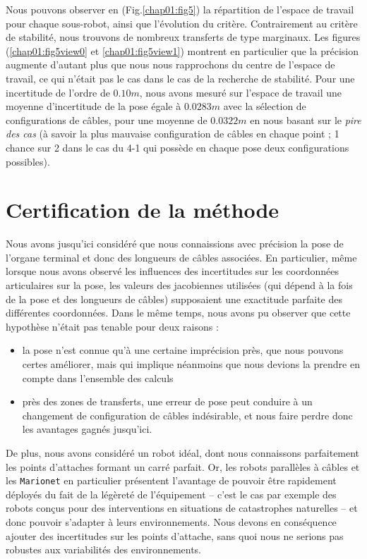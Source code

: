 Nous pouvons observer en (Fig.\ref{chap01:fig5}) la r\'epartition de l'espace 
de travail pour chaque sous-robot, ainsi que l'\'evolution du crit\`ere. 
Contrairement au crit\`ere de stabilit\'e, nous trouvons de nombreux transferts 
de type marginaux. Les figures (\ref{chap01:fig5view0} et 
\ref{chap01:fig5view1}) montrent en particulier que la pr\'ecision augmente 
d'autant plus que nous nous rapprochons du centre de l'espace de travail, ce qui 
n'\'etait pas le cas dans le cas de la recherche de stabilit\'e. Pour une 
incertitude de l'ordre de $0.10m$, nous avons mesur\'e sur l'espace de travail 
une moyenne d'incertitude de la pose \'egale \`a $0.0283m$ avec la s\'election 
de configurations de c\^ables, pour une moyenne de $0.0322m$ en nous basant sur 
le {\it pire des cas} (\`a savoir la plus mauvaise configuration de c\^ables en 
chaque point ; 1 chance sur 2 dans le cas du 4-1 qui poss\`ede en chaque pose 
deux configurations possibles).

\section{Certification de la m\'ethode}

Nous avons jusqu'ici consid\'er\'e que nous connaissions avec pr\'ecision la 
pose de l'organe terminal et donc des longueurs de c\^ables associ\'ees. En 
particulier, m\^eme lorsque nous avons observ\'e les influences des 
incertitudes sur les coordonn\'ees articulaires sur la pose, les 
valeurs des jacobiennes utilis\'ees (qui d\'epend \`a la fois de la pose et des 
longueurs de c\^ables) supposaient une exactitude parfaite des diff\'erentes 
coordonn\'ees. Dans le m\^eme temps, nous avons pu observer que cette 
hypoth\`ese n'\'etait pas tenable pour deux raisons :
\begin{itemize}
 \item la pose n'est connue qu'\`a une certaine impr\'ecision pr\`es, que nous 
pouvons certes am\'eliorer, mais qui implique n\'eanmoins que nous devions la 
prendre en compte dans l'ensemble des calculs
\item pr\`es des zones de transferts, une erreur de pose peut conduire \`a un 
changement de configuration de c\^ables ind\'esirable, et nous faire perdre 
donc 
les avantages gagn\'es jusqu'ici.
\end{itemize}

De plus, nous avons consid\'er\'e un robot id\'eal, dont nous connaissons 
parfaitement les points d'attaches formant un carr\'e parfait. Or, les robots 
parall\`eles \`a c\^ables et les {\tt Marionet} en particulier pr\'esentent 
l'avantage de pouvoir \^etre rapidement d\'eploy\'es du fait de la 
l\'eg\`eret\'e de l'\'equipement -- c'est le cas par exemple des robots con\c 
cus pour des interventions en situations de catastrophes naturelles -- et donc 
pouvoir s'adapter \`a leurs environnements. Nous devons en cons\'equence 
ajouter des incertitudes sur les points d'attache, sans quoi nous ne serions 
pas robustes aux variabilit\'es des environnements.

